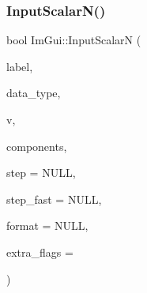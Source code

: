 \subsubsection{\texorpdfstring{Input\+Scalar\+N()}{InputScalarN()}}
{\footnotesize\ttfamily bool Im\+Gui\+::\+Input\+ScalarN (\begin{DoxyParamCaption}\item[{const char $\ast$}]{label,  }\item[{\mbox{\hyperlink{imgui_8h_a4cfa8697a3d76722fff83eb18922e9d5}{Im\+Gui\+Data\+Type}}}]{data\+\_\+type,  }\item[{void $\ast$}]{v,  }\item[{int}]{components,  }\item[{const void $\ast$}]{step = {\ttfamily NULL},  }\item[{const void $\ast$}]{step\+\_\+fast = {\ttfamily NULL},  }\item[{const char $\ast$}]{format = {\ttfamily NULL},  }\item[{\mbox{\hyperlink{imgui_8h_a7d2c6153a6b9b5d3178ce82434ac9fb8}{Im\+Gui\+Input\+Text\+Flags}}}]{extra\+\_\+flags = {} }\end{DoxyParamCaption})}

